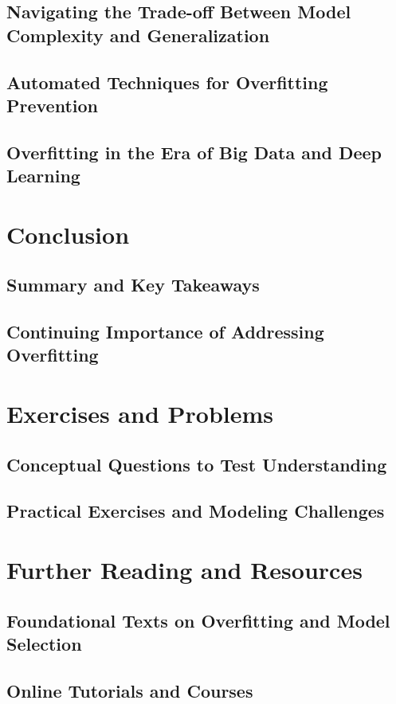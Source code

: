\documentclass[12pt]{book} %
\begin{document}
\subsection{Navigating the Trade-off Between Model Complexity and Generalization}
\subsection{Automated Techniques for Overfitting Prevention}
\subsection{Overfitting in the Era of Big Data and Deep Learning}

\section{Conclusion}
\subsection{Summary and Key Takeaways}
\subsection{Continuing Importance of Addressing Overfitting}

\section{Exercises and Problems}
\subsection{Conceptual Questions to Test Understanding}
\subsection{Practical Exercises and Modeling Challenges}

\section{Further Reading and Resources}
\subsection{Foundational Texts on Overfitting and Model Selection}
\subsection{Online Tutorials and Courses}
\end{document}
